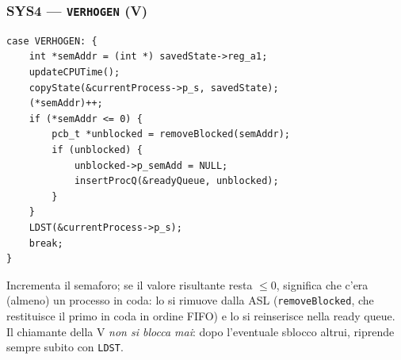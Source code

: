 \documentclass[11pt,a4paper]{article}
\newcommand{\code}[1]{\texttt{#1}}
\begin{document}
\subsubsection{SYS4 --- \code{VERHOGEN} (V)}
\begin{lstlisting}
case VERHOGEN: {
    int *semAddr = (int *) savedState->reg_a1;
    updateCPUTime();
    copyState(&currentProcess->p_s, savedState);
    (*semAddr)++;
    if (*semAddr <= 0) {
        pcb_t *unblocked = removeBlocked(semAddr);
        if (unblocked) {
            unblocked->p_semAdd = NULL;
            insertProcQ(&readyQueue, unblocked);
        }
    }
    LDST(&currentProcess->p_s);
    break;
}
\end{lstlisting}
Incrementa il semaforo; se il valore risultante resta $\le 0$, significa che
c'era (almeno) un processo in coda: lo si rimuove dalla ASL
(\code{removeBlocked}, che restituisce il primo in coda in ordine FIFO) e lo
si reinserisce nella ready queue. Il chiamante della V \emph{non si blocca
mai}: dopo l'eventuale sblocco altrui, riprende sempre subito con
\code{LDST}.
\end{document}
